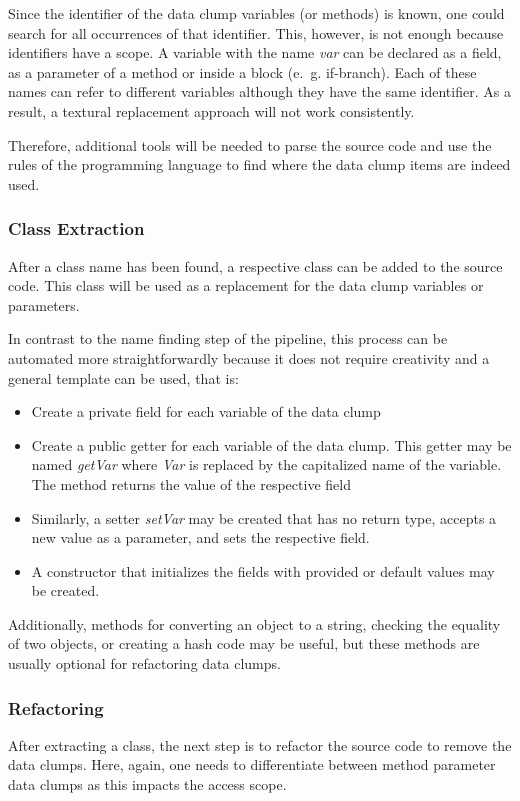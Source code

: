 Since the identifier of the data clump variables (or methods) is known, one could search for all occurrences of that identifier. This, however, is not enough because identifiers have a scope. A variable with the name \textit{var} can be declared as a field, as a parameter of a method or inside a block (e.~g. if-branch). Each of these names can refer to different variables although they have the same identifier. As a result, a textural replacement approach will not work consistently.

Therefore, additional tools will be needed to parse the source code and use the rules of the programming language to find where the data clump items are indeed used.
\subsubsection{Class Extraction}\label{subsec:chap3_data_class_extraction}
After a class name has been found, a respective class can be added to the source code. This class will be used as a replacement for the data clump variables or parameters. 

In contrast to the name finding step of the pipeline, this process can be automated more straightforwardly because it does not require creativity and a general template can be used, that is:
\begin{itemize}
    \item Create a private field for each variable of the data clump
    \item Create a public getter for each variable of the data clump. This getter may be named \textit{getVar} where \textit{Var} is replaced by the capitalized name of the variable. The method returns the value of the respective field
    \item Similarly, a setter \textit{setVar} may be created that has no return type, accepts a new value as a parameter, and sets the respective field. 
    \item A constructor that initializes the fields with provided or default values may be created. 
\end{itemize}

Additionally, methods for converting an object to a string, checking the equality of two objects, or creating a hash code may be useful, but these methods are usually optional for refactoring data clumps. 


\subsubsection{Refactoring}
After extracting a class, the next step is to refactor the source code to remove the data clumps. Here, again, one needs to differentiate between method parameter data clumps as this impacts the access scope. 

